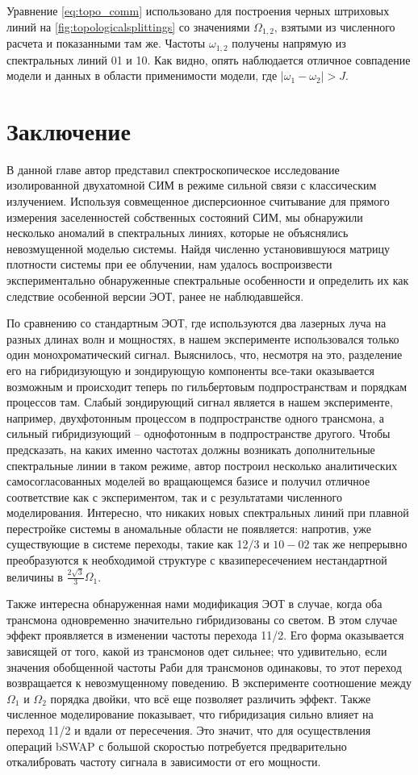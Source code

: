 \documentclass[14pt, a4paper]{extreport}
\numberwithin{equation}{section}
\begin{document}
Уравнение \eqref{eq:topo_comm} использовано для построения черных штриховых линий на \autoref{fig:topologicalsplittings} со значениями $\Omega_{1,2}$, взятыми из численного расчета и показанными там же. Частоты $\omega_{1,2}$ получены напрямую из спектральных линий 01 и 10. Как видно, опять наблюдается отличное совпадение модели и данных в области применимости модели, где $|\omega_1 - \omega_2|>J$.

\section{Заключение}

В данной главе автор представил спектроскопическое исследование изолированной двухатомной СИМ в режиме сильной связи с классическим излучением. Используя совмещенное дисперсионное считывание для прямого измерения заселенностей собственных состояний СИМ, мы обнаружили несколько аномалий в спектральных линиях, которые не объяснялись невозмущенной моделью системы. Найдя численно установившуюся матрицу плотности системы при ее облучении, нам удалось воспроизвести экспериментально обнаруженные спектральные особенности и определить их как следствие особенной версии ЭОТ, ранее не наблюдавшейся.

По сравнению со стандартным ЭОТ, где используются два лазерных луча на разных длинах волн и мощностях, в нашем эксперименте использовался только один монохроматический сигнал. Выяснилось, что, несмотря на это, разделение его на гибридизующую и зондирующую компоненты все-таки оказывается возможным и происходит теперь по гильбертовым подпространствам и порядкам процессов там. Слабый зондирующий сигнал является в нашем эксперименте, например, двухфотонным процессом в подпространстве одного трансмона, а сильный гибридизующий -- однофотонным в подпространстве другого. Чтобы предсказать, на каких именно частотах должны возникать дополнительные спектральные линии в таком режиме, автор построил несколько аналитических самосогласованных моделей во вращающемся базисе и получил отличное соответствие как с экспериментом, так и с результатами численного моделирования. Интересно, что никаких новых спектральных линий при плавной перестройке системы в аномальные области не появляется: напротив, уже существующие в системе переходы, такие как 12/3 и $10-02$  так же непрерывно преобразуются к необходимой структуре с квазипересечением нестандартной величины в $\frac{2\sqrt{3}}{3}\Omega_1$. 

Также интересна обнаруженная нами модификация ЭОТ в случае, когда оба трансмона одновременно значительно гибридизованы со светом. В этом случае эффект проявляется в изменении частоты перехода 11/2. Его форма оказывается зависящей от того, какой из трансмонов одет сильнее; что удивительно, если значения обобщенной частоты Раби для трансмонов одинаковы, то этот переход возвращается к невозмущенному поведению. В эксперименте соотношение между $\Omega_1$ и $\Omega_2$ порядка двойки, что всё еще позволяет различить эффект. Также численное моделирование показывает, что гибридизация сильно влияет на переход 11/2 и вдали от пересечения. Это значит, что для осуществления операций bSWAP с большой скоростью потребуется предварительно откалибровать частоту сигнала в зависимости от его мощности.
\end{document}
